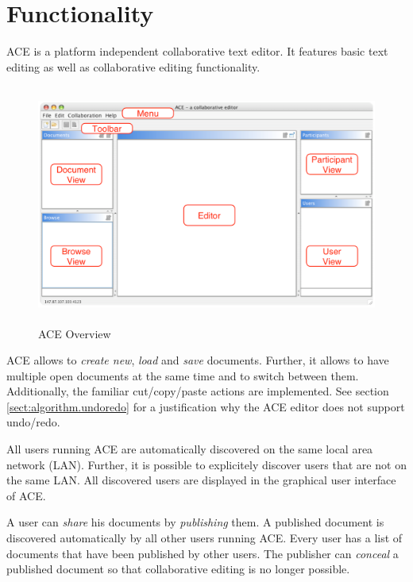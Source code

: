 \chapter{Functionality}
\label{chapter:functionality}

ACE is a platform independent collaborative text editor. It features basic text editing as well as collaborative editing functionality.

\begin{figure}[H]
\begin{center}
  \includegraphics[height=3.1in, width=5.1in]{../images/finalreport/application_ace_overview.eps}
\caption{ACE Overview}
\end{center}
\end{figure}

ACE allows to \emph{create new}, \emph{load} and \emph{save} documents. Further, it allows to have multiple open documents at the same time and to switch between them. Additionally, the familiar cut/copy/paste actions are implemented. See section \ref{sect:algorithm.undoredo} for a justification why the ACE editor does not support undo/redo.

All users running ACE are automatically discovered on the same local area network (LAN). Further, it is possible to explicitely discover users that are not on the same LAN. All discovered users are displayed in the graphical user interface of ACE.

A user can \emph{share} his documents by \emph{publishing} them. A published document is discovered automatically by all other users running ACE. Every user has a list of documents that have been published by other users. The publisher can \emph{conceal} a published document so that collaborative editing is no longer possible.

